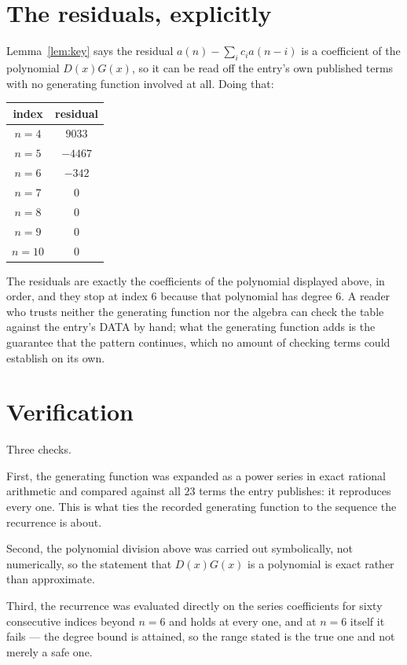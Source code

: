 \documentclass[11pt,a4paper]{article}
\theoremstyle{plain}
\theoremstyle{definition}
\begin{document}
\section{The residuals, explicitly}

Lemma~\ref{lem:key} says the residual $a(n)-\sum_ic_ia(n-i)$ is a coefficient of the
polynomial $D(x)G(x)$, so it can be read off the entry's own published terms with no
generating function involved at all. Doing that:
\begin{center}
\begin{tabular}{cc}
index & residual \\ \hline
$n=4$ & $9033$ \\
$n=5$ & $-4467$ \\
$n=6$ & $-342$ \\
$n=7$ & $0$ \\
$n=8$ & $0$ \\
$n=9$ & $0$ \\
$n=10$ & $0$
\end{tabular}
\end{center}
The residuals are exactly the coefficients of the polynomial displayed above, in order, and
they stop at index $6$ because that polynomial has degree $6$. A reader who trusts
neither the generating function nor the algebra can check the table against the entry's DATA
by hand; what the generating function adds is the guarantee that the pattern continues, which
no amount of checking terms could establish on its own.

\section{Verification}

Three checks.

First, the generating function was expanded as a power series in exact rational arithmetic and
compared against all $23$ terms the entry publishes: it reproduces every one. This is
what ties the recorded generating function to the sequence the recurrence is about.

Second, the polynomial division above was carried out symbolically, not numerically, so the
statement that $D(x)G(x)$ is a polynomial is exact rather than approximate.

Third, the recurrence was evaluated directly on the series coefficients for sixty consecutive
indices beyond $n=6$ and holds at every one, and at $n=6$ itself it fails --- the
degree bound is attained, so the range stated is the true one and not merely a safe one.
\end{document}
